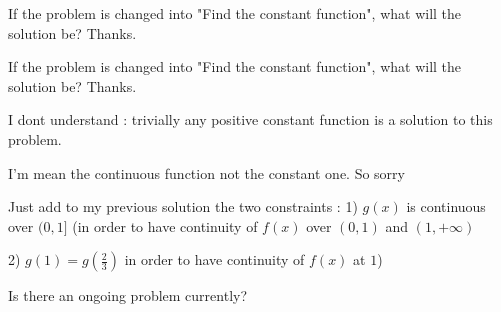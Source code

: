 \begin{solution}
	If the problem is changed into "Find the constant function", what will the solution be? Thanks.
\end{solution}



\begin{solution}
	\begin{tcolorbox}If the problem is changed into "Find the constant function", what will the solution be? Thanks.\end{tcolorbox}
I dont understand : trivially any positive constant function is a solution to this problem.


\end{solution}






\begin{solution}
	\begin{tcolorbox} I'm mean the continuous function not the constant one. So sorry\end{tcolorbox}
Just add to my previous solution the two constraints :
1) $g(x)$ is continuous over $(0,1]$ (in order to have continuity of $f(x)$ over $(0,1)$ and $(1,+\infty)$

2) $g(1)=g(\frac 23)$ in order to have continuity of $f(x)$ at $1$)



\end{solution}



\begin{solution}
	Is there an ongoing problem currently?
\end{solution}




